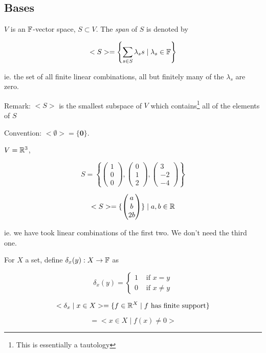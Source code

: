 \documentclass[a4paper]{article}
\begin{document}
\subsection{Bases}

\begin{defi}
	$ V $ is an $ \mathbb{F} $-vector space, $ S \subset V $. The \emph{span} of $ S $ is denoted by 
	
	\[ <S> = \left\{ \sum_{s \in S}  \lambda_{s} s \; | \; \lambda_{s} \in \mathbb{F} \right\}  \]
	
	ie. the set of all finite linear combinations, all but finitely many of the $ \lambda_{s} $ are zero.
\end{defi}

Remark: $ <S> $ is the smallest subspace of $ V $ which contains\footnote{This is essentially a tautology} all of the elements of $ S $

Convention: $  < \emptyset > = \{ \mathbf{0} \} $.

\begin{eg}
	$ V = \mathbb{R}^{3} $, 
	
	\[ S = \left\{ \begin{pmatrix}
	1 \\
	0 \\
	0
	
	\end{pmatrix}, \begin{pmatrix}
	0\\
	1\\
	2
	
	\end{pmatrix}, \begin{pmatrix}
	3\\
	-2\\
	-4
	\end{pmatrix} \right\}  \]
	
	
	\[ <S> = \{ \begin{pmatrix}
	a\\
	b\\
	2b
	\end{pmatrix} \} \; | \; a,b \in \mathbb{R} \]
	
	ie. we have took linear combinations of the first two. We don't need the third one.
	
\end{eg}



\begin{eg}
	For $ X $ a set, define $ \delta_{x}(y) : X \to \mathbb{F} $ as 
	
	
	\[ \delta_{x}(y) = \begin{cases} 1  & \text{ if } x = y \\ 0  & \text{ if } x \neq y \end{cases}  \]
	
	\[ < \delta_{x} \; | \; x \in X > = \{  f \in \mathbb{R}^{X} \; | \; f \text{ has finite support} \}  \]
	
	\[ = <  x \in X \; | \; f(x) \neq 0 > \]
\end{eg}
\end{document}
